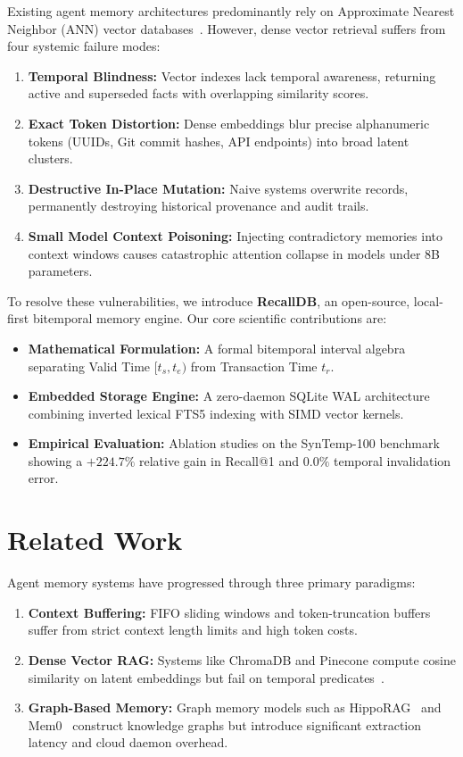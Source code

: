 \documentclass[conference]{IEEEtran}
\begin{document}
Existing agent memory architectures predominantly rely on Approximate Nearest Neighbor (ANN) vector databases~\cite{lewis2020retrieval}. However, dense vector retrieval suffers from four systemic failure modes:
\begin{enumerate}
    \item \textbf{Temporal Blindness:} Vector indexes lack temporal awareness, returning active and superseded facts with overlapping similarity scores.
    \item \textbf{Exact Token Distortion:} Dense embeddings blur precise alphanumeric tokens (UUIDs, Git commit hashes, API endpoints) into broad latent clusters.
    \item \textbf{Destructive In-Place Mutation:} Naive systems overwrite records, permanently destroying historical provenance and audit trails.
    \item \textbf{Small Model Context Poisoning:} Injecting contradictory memories into context windows causes catastrophic attention collapse in models under 8B parameters.
\end{enumerate}

To resolve these vulnerabilities, we introduce \textbf{RecallDB}, an open-source, local-first bitemporal memory engine. Our core scientific contributions are:
\begin{itemize}
    \item \textbf{Mathematical Formulation:} A formal bitemporal interval algebra separating Valid Time $[t_s, t_e)$ from Transaction Time $t_r$.
    \item \textbf{Embedded Storage Engine:} A zero-daemon SQLite WAL architecture combining inverted lexical FTS5 indexing with SIMD vector kernels.
    \item \textbf{Empirical Evaluation:} Ablation studies on the SynTemp-100 benchmark showing a $+224.7\%$ relative gain in Recall@1 and $0.0\%$ temporal invalidation error.
\end{itemize}

\section{Related Work}

Agent memory systems have progressed through three primary paradigms:
\begin{enumerate}
    \item \textbf{Context Buffering:} FIFO sliding windows and token-truncation buffers suffer from strict context length limits and high token costs.
    \item \textbf{Dense Vector RAG:} Systems like ChromaDB and Pinecone compute cosine similarity on latent embeddings but fail on temporal predicates~\cite{lewis2020retrieval}.
    \item \textbf{Graph-Based Memory:} Graph memory models such as HippoRAG~\cite{gutierrez2024hipporag} and Mem0~\cite{alake2026decoupled} construct knowledge graphs but introduce significant extraction latency and cloud daemon overhead.
\end{enumerate}
\end{document}
